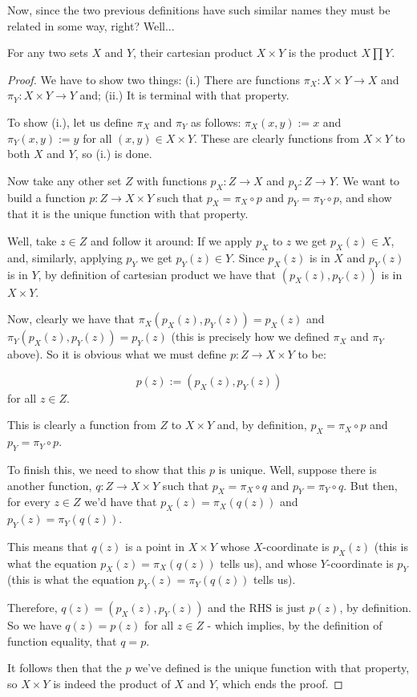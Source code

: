 Now, since the two previous definitions have such similar names they must be related in some way, right? Well...
\begin{prop}
	For any two sets $X$ and $Y$, their cartesian product $X\times Y$ is the product $X\prod Y$.
\end{prop}
\begin{proof}
	We have to show two things: (i.) There are functions $\pi_X:X\times Y\to X$ and $\pi_Y:X\times Y \to Y$ and; (ii.) It is terminal with that property.
	
	\bigskip
	To show (i.), let us define $\pi_X$ and $\pi_Y$ as follows: $\pi_X(x,y):=x$ and $\pi_Y(x,y):=y$ for all $(x,y)\in X\times Y$. These are clearly functions from $X\times Y$ to both $X$ and $Y$, so (i.) is done.
	
	\bigskip
	Now take any other set $Z$ with functions $p_X:Z\to X$ and $p_Y:Z\to Y$. We want to build a function $p:Z\to X\times Y$ such that $p_X=\pi_X\circ p$ and $p_Y=\pi_Y\circ p$, and show that it is the unique function with that property.
	
	Well, take $z\in Z$ and follow it around: If we apply $p_X$ to $z$ we get $p_X(z)\in X$, and, similarly, applying $p_Y$ we get $p_Y(z)\in Y$. Since $p_X(z)$ is in $X$ and $p_Y(z)$ is in $Y$, by definition of cartesian product we have that $(p_X(z),p_Y(z))$ is in $X\times Y$.
	
	Now, clearly we have that $\pi_X(p_X(z),p_Y(z))=p_X(z)$ and $\pi_Y(p_X(z),p_Y(z))=p_Y(z)$ (this is precisely how we defined $\pi_X$ and $\pi_Y$ above). So it is obvious what we must define $p:Z\to X\times Y$ to be:
	
	\[p(z):=(p_X(z),p_Y(z))\]for all $z\in Z$.
	
	This is clearly a function from $Z$ to $X\times Y$ and, by definition, $p_X=\pi_X\circ p$ and $p_Y=\pi_Y\circ p$.
	
	
	\bigskip
	To finish this, we need to show that this $p$ is unique. Well, suppose there is another function, $q:Z\to X\times Y$ such that $p_X=\pi_X\circ q$ and $p_Y=\pi_Y\circ q$. But then, for every $z\in Z$ we'd have that $p_X(z)=\pi_X(q(z))$ and $p_Y(z)=\pi_Y(q(z))$.
	
	This means that $q(z)$ is a point in $X\times Y$ whose $X$-coordinate is $p_X(z)$ (this is what the equation $p_X(z)=\pi_X(q(z))$ tells us), and whose $Y$-coordinate is $p_Y$ (this is what the equation \(p_Y(z)=\pi_Y(q(z))\) tells us).
	
	Therefore, $q(z)=(p_X(z),p_Y(z))$ and the RHS is just $p(z)$, by definition. So we have $q(z)=p(z)$ for all $z\in Z$ - which implies, by the definition of function equality, that $q=p$.
	
	It follows then that the $p$ we've defined is the unique function with that property, so $X\times Y$ is indeed the product of $X$ and $Y$, which ends the proof.
\end{proof}

